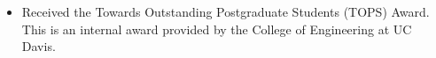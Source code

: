 \documentclass[11pt,a4paper]{moderncv}
\newcommand{\sep}{$~\bullet~$}
\begin{document}
\begin{itemize}
\item Received the Towards Outstanding Postgraduate Students (TOPS) Award.
  This is an internal award provided by the College of Engineering at UC Davis.
\end{itemize}
%
%
%
%
%
%
%
\end{document}
